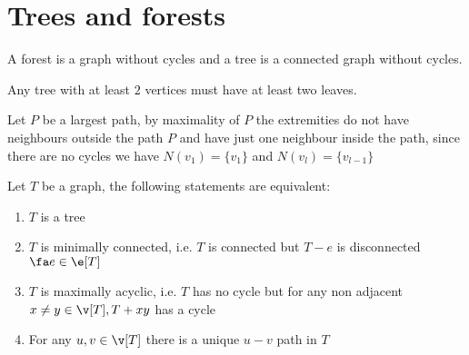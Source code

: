 \section{Trees and forests}
A forest is a graph without cycles and a tree is a connected graph without cycles.
\begin{lemma}
    Any tree with at least $2$ vertices must have at least two leaves.
\end{lemma}
\begin{prf}
    Let $P$ be a largest path, by maximality of $P$ the extremities do not have neighbours outside the path $P$ and have just one neighbour inside the path, since there are no cycles we have $N(v_1) = \{v_1\}$ and $N(v_l) = \{v_{l - 1}\}$
\end{prf}
\begin{theorem}
    Let $T$ be a graph, the following statements are equivalent:
    \begin{enumerate}
        \item $T$ is a tree
        \item $T$ is minimally connected, i.e. $T$ is connected but $T - e$ is disconnected $\fa e \in \e[T]$
        \item $T$ is maximally acyclic, i.e. $T$ has no cycle but for any non adjacent $x \neq y \in \v[T], T + xy$ has a cycle
        \item For any $u, v \in \v[T]$ there is a unique $u - v$ path in $T$
    \end{enumerate}
\end{theorem}

